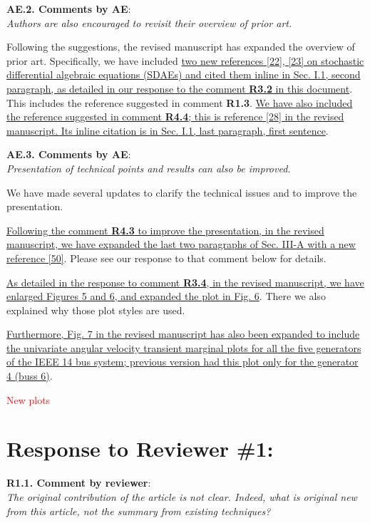 \documentclass[12pt,onecolumn]{IEEEtran}
\newcommand{\blue}{\color{blue}}
\newcommand{\red}{\textcolor{red}}
\def\spacingset#1{\def\baselinestretch{#1}\small\normalsize}
\newcommand{\nib}{\noindent  {\bf Response:} }
\begin{document}
\noindent
{\bf AE.2. Comments by AE}:\\
{\em Authors are also encouraged to revisit their overview of prior art.}

{\nib {\blue Following the suggestions, the revised manuscript has expanded the overview of prior art. Specifically, we have included \ul{two new references [22], [23] on stochastic differential algebraic equations (SDAEs) and cited them inline in Sec. I.1, second paragraph, as detailed in our response to the comment \textbf{R3.2} in this document}. This includes the reference suggested in comment \textbf{R1.3}. \ul{We have also included the reference suggested in comment \textbf{R4.4}; this is reference [28] in the revised manuscript. Its inline citation is in Sec. I.1, last paragraph, first sentence}.}}


\noindent
{\bf AE.3. Comments by AE}:\\
{\em Presentation of technical points and results can also be improved.}

{\nib {\blue We have made several updates to clarify the technical issues and to improve the presentation.

\ul{Following the comment \textbf{R4.3} to improve the presentation, in the revised manuscript, we have expanded the last two paragraphs of Sec. III-A with a new reference [50]}. Please see our response to that comment below for details. 

\ul{As detailed in the response to comment \textbf{R3.4}, in the revised manuscript, we have enlarged Figures 5 and 6, and expanded the plot in Fig. 6}. There we also explained why those plot styles are used.

\ul{Furthermore, Fig. 7 in the revised manuscript has also been expanded to include the univariate angular velocity transient marginal plots for all the five generators of the IEEE 14 bus system; previous version had this plot only for the generator 4 (buss 6)}.

{\red{New plots}}
}}





\newpage
\spacingset{1}

\section*{\large \bf Response to Reviewer \#1:}


\noindent
{\bf R1.1. Comment by reviewer}:\\
{\em The original contribution of the article is not clear.  Indeed, what is original new from this article, not the summary from existing techniques?}
\end{document}
